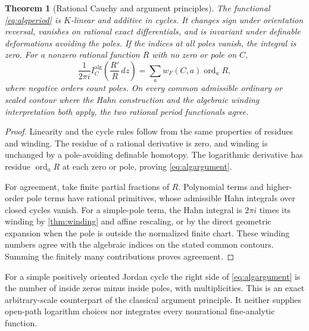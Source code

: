 \documentclass[11pt,letterpaper]{article}
\newtheorem{theorem}{Theorem}[section]
\theoremstyle{definition}
\theoremstyle{remark}
\newcommand{\ord}{\operatorname{ord}}
\numberwithin{equation}{section}
\begin{document}
\begin{theorem}[Rational Cauchy and argument principles]\label{thm:rational}
The functional \eqref{eq:algperiod} is $K$-linear and additive in cycles. It changes sign under orientation reversal, vanishes on rational exact differentials, and is invariant under definable deformations avoiding the poles. If the indices at all poles vanish, the integral is zero. For a nonzero rational function $R$ with no zero or pole on $C$,
\begin{equation}\label{eq:algargument}
\frac1{2\pi i}I_C^{\mathrm{alg}}\left(\frac{R'}R\,dz\right)
=\sum_a w_F(C,a)\ord_aR,
\end{equation}
where negative orders count poles. On every common admissible ordinary or scaled contour where the Hahn construction and the algebraic winding interpretation both apply, the two rational period functionals agree.
\end{theorem}
\begin{proof}
Linearity and the cycle rules follow from the same properties of residues and winding. The residue of a rational derivative is zero, and winding is unchanged by a pole-avoiding definable homotopy. The logarithmic derivative has residue $\ord_aR$ at each zero or pole, proving \eqref{eq:algargument}.

For agreement, take finite partial fractions of $R$. Polynomial terms and higher-order pole terms have rational primitives, whose admissible Hahn integrals over closed cycles vanish. For a simple-pole term, the Hahn integral is $2\pi i$ times its winding by \cref{thm:winding} and affine rescaling, or by the direct geometric expansion when the pole is outside the normalized finite chart. These winding numbers agree with the algebraic indices on the stated common contours. Summing the finitely many contributions proves agreement.
\end{proof}
For a simple positively oriented Jordan cycle the right side of \eqref{eq:algargument} is the number of inside zeros minus inside poles, with multiplicities. This is an exact arbitrary-scale counterpart of the classical argument principle. It neither supplies open-path logarithm choices nor integrates every nonrational fine-analytic function.
\end{document}
